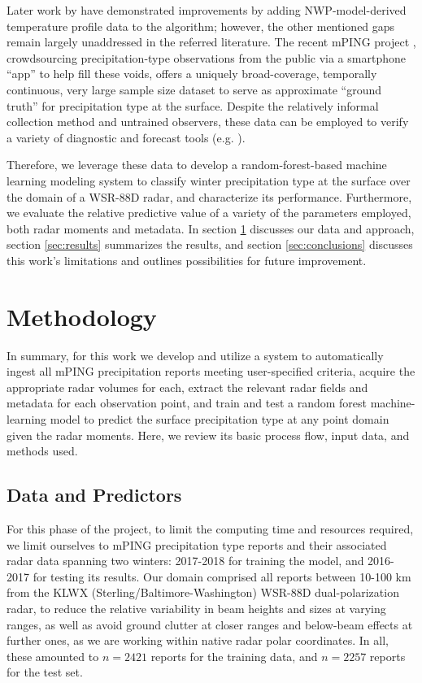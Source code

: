 \documentclass{agujournal}
\begin{document}
Later work by \textcite{Schuur2012} have demonstrated improvements by adding NWP-model-derived temperature profile data to the algorithm; however, the other mentioned gaps remain largely unaddressed in the referred literature. The recent mPING project \parencite{Elmore2014}, crowdsourcing precipitation-type observations from the public via a smartphone “app” to help fill these voids, offers a uniquely broad-coverage, temporally continuous, very large sample size dataset to serve as approximate “ground truth” for precipitation type at the surface. Despite the relatively informal collection method and untrained observers, these data can be employed to verify a variety of diagnostic and forecast tools (e.g. \cite{Elmore2015}).

Therefore, we leverage these data to develop a random-forest-based machine learning modeling system to classify winter precipitation type at the surface over the domain of a WSR-88D radar, and characterize its performance. Furthermore, we evaluate the relative predictive value of a variety of the parameters employed, both radar moments and metadata. In section \ref{sec:method} discusses our data and approach, section \ref{sec:results} summarizes the results, and section \ref{sec:conclusions} discusses this work's limitations and outlines possibilities for future improvement.


\section{Methodology} \label{sec:method}

In summary, for this work we develop and utilize a system to automatically ingest all mPING precipitation reports meeting user-specified criteria, acquire the appropriate radar volumes for each, extract the relevant radar fields and metadata for each observation point, and train and test a random forest machine-learning model to predict the surface precipitation type at any point domain given the radar moments. Here, we review its basic process flow, input data, and methods used.


\subsection{Data and Predictors}

For this phase of the project, to limit the computing time and resources required, we limit ourselves to mPING precipitation type reports and their associated radar data spanning two winters: 2017-2018 for training the model, and 2016-2017 for testing its results. Our domain comprised all reports between 10-100 km from the KLWX (Sterling/Baltimore-Washington) WSR-88D dual-polarization radar, to reduce the relative variability in beam heights and sizes at varying ranges, as well as avoid ground clutter at closer ranges and below-beam effects at further ones, as we are working within native radar polar coordinates. In all, these amounted to $n = 2421$ reports for the training data, and $n = 2257$ reports for the test set.
\end{document}
